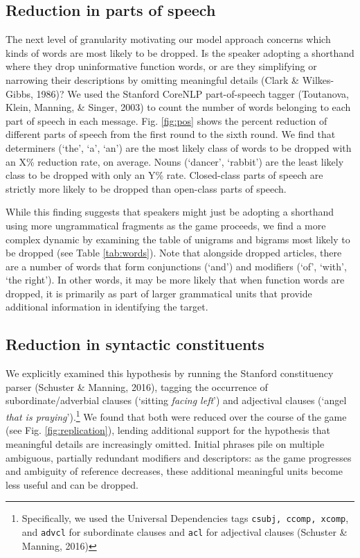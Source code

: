 \documentclass[alpha-refs]{wiley-article}
\begin{document}
\subsection{Reduction in parts of speech}
The next level of granularity motivating our model approach concerns which kinds of words are most likely to be dropped. 
Is the speaker adopting a shorthand where they drop uninformative function words, or are they simplifying or narrowing their descriptions by omitting meaningful details (Clark \& Wilkes-Gibbs, 1986)? 
We used the Stanford CoreNLP part-of-speech tagger (Toutanova, Klein, Manning, \& Singer, 2003) to count the number of words belonging to each part of speech in each message. Fig. \ref{fig:pos} shows the percent reduction of different parts of speech from the first round to the sixth round. 
We find that determiners (`the', `a', `an') are the most likely class of words to be dropped with an X\% reduction rate, on average. 
Nouns (`dancer', `rabbit') are the least likely class to be dropped with only an Y\% rate. 
Closed-class parts of speech are strictly more likely to be dropped than open-class parts of speech.

While this finding suggests that speakers might just be adopting a
shorthand using more ungrammatical fragments as the game proceeds, we
find a more complex dynamic by examining the table of unigrams and
bigrams most likely to be dropped (see Table \ref{tab:words}). Note that
alongside dropped articles, there are a number of words that form
conjunctions (`and') and modifiers (`of', `with', `the right'). In other
words, it may be more likely that when function words are dropped, it is
primarily as part of larger grammatical units that provide additional
information in identifying the target.

\subsection{Reduction in syntactic constituents}
We explicitly examined this hypothesis by running the Stanford
constituency parser (Schuster \& Manning, 2016), tagging the occurrence
of subordinate/adverbial clauses (`sitting \emph{facing left}') and
adjectival clauses (`angel \emph{that is praying}').\footnote{Specifically,
  we used the Universal Dependencies tags \texttt{csubj, ccomp, xcomp},
  and \texttt{advcl} for subordinate clauses and \texttt{acl} for
  adjectival clauses (Schuster \& Manning, 2016)} We found that both
were reduced over the course of the game (see Fig.
\ref{fig:replication}), lending additional support for the hypothesis
that meaningful details are increasingly omitted. Initial phrases pile
on multiple ambiguous, partially redundant modifiers and descriptors: as
the game progresses and ambiguity of reference decreases, these
additional meaningful units become less useful and can be dropped.
\end{document}

